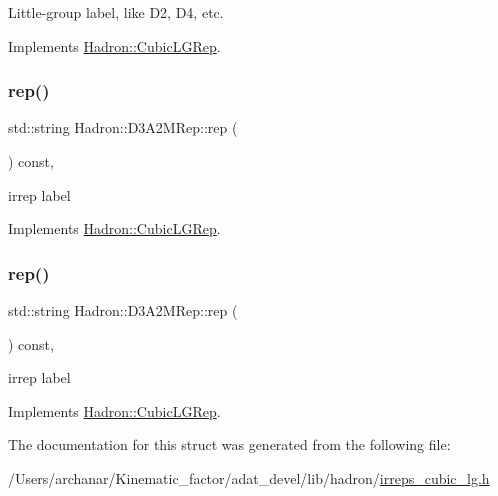 Little-\/group label, like D2, D4, etc. 

Implements \mbox{\hyperlink{structHadron_1_1CubicLGRep_a9bdb14b519a611d21379ed96a3a9eb41}{Hadron\+::\+Cubic\+L\+G\+Rep}}.

\mbox{\label{structHadron_1_1D3A2MRep_a64bf3c3f5c0fa0e49aa2f74421308ac3}} 
\subsubsection{\texorpdfstring{rep()}{rep()}\hspace{0.1cm}{\footnotesize\ttfamily [1/2]}}
{\footnotesize\ttfamily std\+::string Hadron\+::\+D3\+A2\+M\+Rep\+::rep (\begin{DoxyParamCaption}{ }\end{DoxyParamCaption}) const\hspace{0.3cm}{\ttfamily [inline]}, {\ttfamily [virtual]}}

irrep label 

Implements \mbox{\hyperlink{structHadron_1_1CubicLGRep_a50f5ddbb8f4be4cee0106fa9e8c75e6c}{Hadron\+::\+Cubic\+L\+G\+Rep}}.

\mbox{\label{structHadron_1_1D3A2MRep_a64bf3c3f5c0fa0e49aa2f74421308ac3}} 
\subsubsection{\texorpdfstring{rep()}{rep()}\hspace{0.1cm}{\footnotesize\ttfamily [2/2]}}
{\footnotesize\ttfamily std\+::string Hadron\+::\+D3\+A2\+M\+Rep\+::rep (\begin{DoxyParamCaption}{ }\end{DoxyParamCaption}) const\hspace{0.3cm}{\ttfamily [inline]}, {\ttfamily [virtual]}}

irrep label 

Implements \mbox{\hyperlink{structHadron_1_1CubicLGRep_a50f5ddbb8f4be4cee0106fa9e8c75e6c}{Hadron\+::\+Cubic\+L\+G\+Rep}}.



The documentation for this struct was generated from the following file\+:\begin{DoxyCompactItemize}
\item 
/\+Users/archanar/\+Kinematic\+\_\+factor/adat\+\_\+devel/lib/hadron/\mbox{\hyperlink{lib_2hadron_2irreps__cubic__lg_8h}{irreps\+\_\+cubic\+\_\+lg.\+h}}\end{DoxyCompactItemize}
